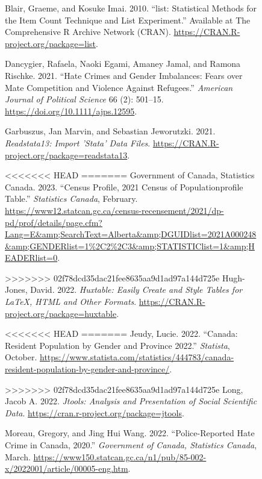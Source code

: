 \documentclass[
]{article}
\newlength{\cslhangindent}
\newlength{\cslentryspacingunit} %
\newenvironment{CSLReferences}[2] %
 {%
  \setlength{\parindent}{0pt}
  \ifodd #1
  \let\oldpar\par
  \def\par{\hangindent=\cslhangindent\oldpar}
  \fi
  \setlength{\parskip}{#2\cslentryspacingunit}
 }%
 {}
\begin{document}
\begin{figure}
\begin{CSLReferences}{1}{0}
\leavevmode{}%
Blair, Graeme, and Kosuke Imai. 2010. {``{list}: Statistical Methods for
the Item Count Technique and List Experiment.''} Available at The
Comprehensive R Archive Network (CRAN).
\url{https://CRAN.R-project.org/package=list}.

\leavevmode{}%
Dancygier, Rafaela, Naoki Egami, Amaney Jamal, and Ramona Rischke. 2021.
{``Hate Crimes and Gender Imbalances: Fears over Mate Competition and
Violence Against Refugees.''} \emph{American Journal of Political
Science} 66 (2): 501--15. \url{https://doi.org/10.1111/ajps.12595}.

\leavevmode{}%
Garbuszus, Jan Marvin, and Sebastian Jeworutzki. 2021.
\emph{Readstata13: Import 'Stata' Data Files}.
\url{https://CRAN.R-project.org/package=readstata13}.

<<<<<<< HEAD
=======
\leavevmode{}%
Government of Canada, Statistics Canada. 2023. {``Census Profile, 2021
Census of Populationprofile Table.''} \emph{Statistics Canada},
February.
\url{https://www12.statcan.gc.ca/census-recensement/2021/dp-pd/prof/details/page.cfm?Lang=E\&amp;SearchText=Alberta\&amp;DGUIDlist=2021A000248\&amp;GENDERlist=1\%2C2\%2C3\&amp;STATISTIClist=1\&amp;HEADERlist=0}.

>>>>>>> 02f78dcd35dac21fee8635aa9d1ad97a144d725e
\leavevmode{}%
Hugh-Jones, David. 2022. \emph{Huxtable: Easily Create and Style Tables
for LaTeX, HTML and Other Formats}.
\url{https://CRAN.R-project.org/package=huxtable}.

<<<<<<< HEAD
=======
\leavevmode{}%
Jeudy, Lucie. 2022. {``Canada: Resident Population by Gender and
Province 2022.''} \emph{Statista}, October.
\url{https://www.statista.com/statistics/444783/canada-resident-population-by-gender-and-province/}.

>>>>>>> 02f78dcd35dac21fee8635aa9d1ad97a144d725e
\leavevmode{}%
Long, Jacob A. 2022. \emph{Jtools: Analysis and Presentation of Social
Scientific Data}. \url{https://cran.r-project.org/package=jtools}.

\leavevmode{}%
Moreau, Gregory, and Jing Hui Wang. 2022. {``Police-Reported Hate Crime
in Canada, 2020.''} \emph{Government of Canada, Statistics Canada},
March.
\url{https://www150.statcan.gc.ca/n1/pub/85-002-x/2022001/article/00005-eng.htm}.


\end{CSLReferences}
\end{figure}
\end{document}
